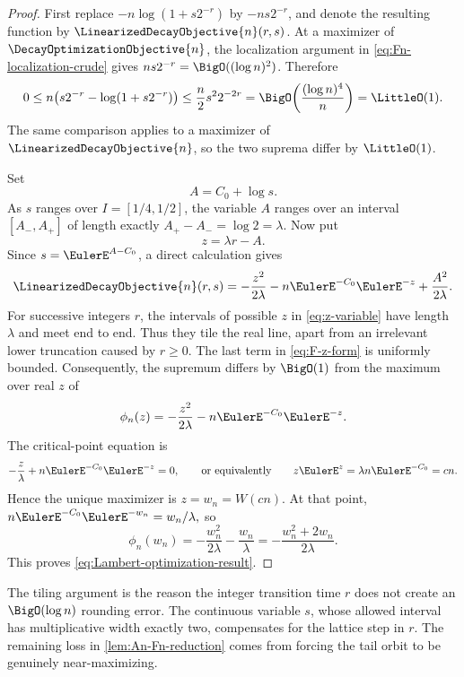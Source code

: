 \documentclass[11pt,oneside]{article}
\theoremstyle{definition}
\theoremstyle{remark}
\begin{document}
\begin{proof}
First replace \(-n\log(1+s2^{-r})\) by \(-ns2^{-r}\), and denote the
resulting function by \(\LinearizedDecayObjective{n}(r,s)\).  At a maximizer of
\(\DecayOptimizationObjective{n}\), the localization argument in
\eqref{eq:Fn-localization-crude} gives
\(ns2^{-r}=\BigO((\log n)^2)\).  Therefore
\[
 0\le n\bigl(s2^{-r}-\log(1+s2^{-r})\bigr)
 \le\frac n2s^22^{-2r}
 =\BigO\!\left(\frac{(\log n)^4}{n}\right)=\LittleO(1).
\]
The same comparison applies to a maximizer of \(\LinearizedDecayObjective{n}\), so the two suprema
differ by \(\LittleO(1)\).

Set
\[
 A=C_0+\log s.
\]
As \(s\) ranges over \(I=[1/4,1/2]\), the variable \(A\) ranges over an
interval \([A_-,A_+]\) of length exactly
\(
 A_+-A_-=\log2=\lambda.
\)
Now put
\begin{equation}
 z=\lambda r-A.
 \label{eq:z-variable}
\end{equation}
Since \(s=\EulerE^{A-C_0}\), a direct calculation gives
\begin{equation}
 \LinearizedDecayObjective{n}(r,s)
 =-\frac{z^2}{2\lambda}
 -n\EulerE^{-C_0}\EulerE^{-z}
 +\frac{A^2}{2\lambda}.
 \label{eq:F-z-form}
\end{equation}
For successive integers \(r\), the intervals of possible \(z\) in
\eqref{eq:z-variable} have length \(\lambda\) and meet end to end.  Thus they
tile the real line, apart from an irrelevant lower truncation caused by
\(r\ge0\).  The last term in \eqref{eq:F-z-form} is uniformly bounded.
Consequently, the supremum differs by \(\BigO(1)\) from the maximum over real
\(z\) of
\[
 \phi_n(z)=-\frac{z^2}{2\lambda}-n\EulerE^{-C_0}\EulerE^{-z}.
\]
The critical-point equation is
\[
 -\frac z\lambda+n\EulerE^{-C_0}\EulerE^{-z}=0,
 \qquad\text{or equivalently}\qquad
 z\EulerE^z=\lambda n\EulerE^{-C_0}=cn.
\]
Hence the unique maximizer is \(z=w_n=W(cn)\).  At that point,
\(
 n\EulerE^{-C_0}\EulerE^{-w_n}=w_n/\lambda,
\)
so
\[
 \phi_n(w_n)
 =-\frac{w_n^2}{2\lambda}-\frac{w_n}{\lambda}
 =-\frac{w_n^2+2w_n}{2\lambda}.
\]
This proves \eqref{eq:Lambert-optimization-result}.
\end{proof}

The tiling argument is the reason the integer transition time \(r\) does not
create an \(\BigO(\log n)\) rounding error.  The continuous variable \(s\),
whose allowed interval has multiplicative width exactly two, compensates for
the lattice step in \(r\).  The remaining loss in
\cref{lem:An-Fn-reduction} comes from forcing the tail orbit to be genuinely
near-maximizing.
\end{document}
